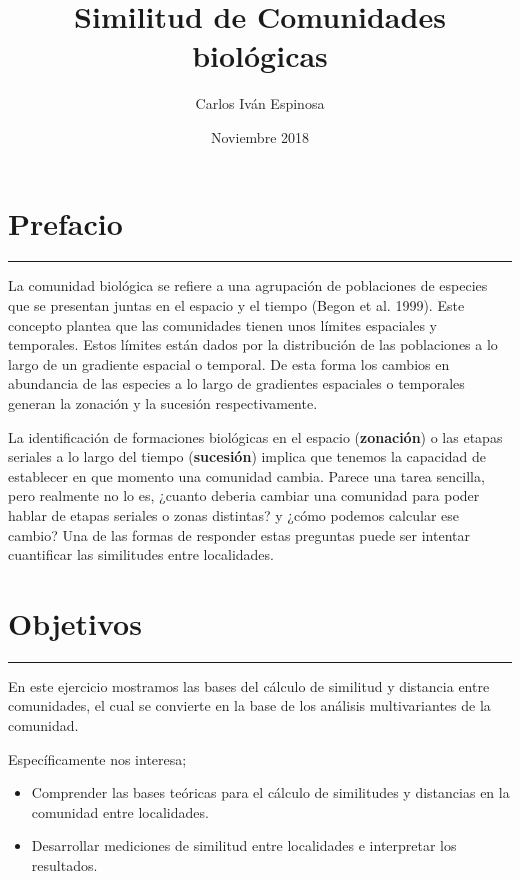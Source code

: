 \documentclass[]{book}
\title{Similitud de Comunidades biológicas}
\author{Carlos Iván Espinosa}
\date{Noviembre 2018}
\providecommand{\tightlist}{%
  \setlength{\itemsep}{0pt}\setlength{\parskip}{0pt}}
\begin{document}
\maketitle

{
\setcounter{tocdepth}{1}
\tableofcontents
}
\chapter*{Prefacio}\label{prefacio}

\begin{center}\rule{0.5\linewidth}{\linethickness}\end{center}

La comunidad biológica se refiere a una agrupación de poblaciones de
especies que se presentan juntas en el espacio y el tiempo (Begon et al.
1999). Este concepto plantea que las comunidades tienen unos límites
espaciales y temporales. Estos límites están dados por la distribución
de las poblaciones a lo largo de un gradiente espacial o temporal. De
esta forma los cambios en abundancia de las especies a lo largo de
gradientes espaciales o temporales generan la zonación y la sucesión
respectivamente.

La identificación de formaciones biológicas en el espacio
(\textbf{zonación}) o las etapas seriales a lo largo del tiempo
(\textbf{sucesión}) implica que tenemos la capacidad de establecer en
que momento una comunidad cambia. Parece una tarea sencilla, pero
realmente no lo es, ¿cuanto deberia cambiar una comunidad para poder
hablar de etapas seriales o zonas distintas? y ¿cómo podemos calcular
ese cambio? Una de las formas de responder estas preguntas puede ser
intentar cuantificar las similitudes entre localidades.

\chapter*{Objetivos}\label{objetivos}

\begin{center}\rule{0.5\linewidth}{\linethickness}\end{center}

En este ejercicio mostramos las bases del cálculo de similitud y
distancia entre comunidades, el cual se convierte en la base de los
análisis multivariantes de la comunidad.

Específicamente nos interesa;

\begin{itemize}
\tightlist
\item
  Comprender las bases teóricas para el cálculo de similitudes y
  distancias en la comunidad entre localidades.
\item
  Desarrollar mediciones de similitud entre localidades e interpretar
  los resultados.
\end{itemize}
\end{document}

